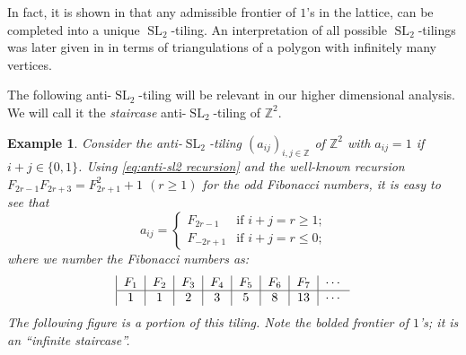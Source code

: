 \documentclass[12pt]{amsart}
\newtheorem{example}[theorem]{Example}
\newcommand{\SL}{\operatorname{SL}}
\newcommand{\ZZ}{\mathbb{Z}}
\begin{document}
  In fact, it is shown in \cite{AssemReutenauerSmith} that any admissible frontier of $1$'s in the lattice, can be completed into a unique $\SL_2$-tiling.
  An interpretation of all possible $\SL_2$-tilings was later given in \cite{BessenrodtHolmJorgensen} in terms of triangulations of a polygon with infinitely many vertices.

  The following anti-$\SL_2$-tiling will be relevant in our higher dimensional analysis.
  We will call it the \emph{staircase} anti-$\SL_2$-tiling of $\ZZ^2$.
  \begin{example}\label{ex:Fibonacci}
    Consider the anti-$\SL_2$-tiling $(a_{ij})_{i,j\in\ZZ}$ of $\ZZ^2$ with $a_{ij}=1$ if $i+j\in\{0,1\}$.
    Using \eqref{eq:anti-sl2 recursion} and the well-known recursion $F_{2r-1}F_{2r+3}=F_{2r+1}^2+1$ $(r\ge1)$ for the odd Fibonacci numbers, it is easy to see that
      \[
        a_{ij}
        =
        \begin{cases}
          F_{2r-1} & \text{if $i+j=r\ge1$;}\\
          F_{-2r+1} & \text{if $i+j=r\le0$;}
        \end{cases}
      \]
      where we number the Fibonacci numbers as:
      \[
        \begin{tabular}{|c|c|c|c|c|c|c|c}
          $F_1$ & $F_2$ & $F_3$ & $F_4$ & $F_5$ & $F_6$ & $F_7$ & $\cdots$\\
          \hline 1 & 1 & 2 & 3 & 5 & 8 & 13 & $\cdots$
        \end{tabular}
      \]
      The following figure is a portion of this tiling.
      Note the bolded frontier of $1$'s; it is an ``infinite staircase''.
      \begin{center}
\end{center}
\end{example}
\end{document}
